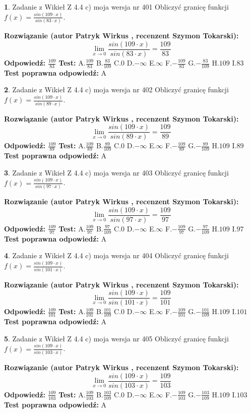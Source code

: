 \documentclass[12pt, a4paper]{article}
\theoremstyle{definition} %
\newtheorem{zad}{}
\newcommand{\zadStart}[1]{\begin{zad}#1\newline}
\newcommand{\zadStop}{\end{zad}}
\newcommand{\rozwStart}[2]{\noindent \textbf{Rozwiązanie (autor #1 , recenzent #2): }\newline}
\newcommand{\rozwStop}{\newline}
\newcommand{\odpStart}{\noindent \textbf{Odpowiedź:}\newline}
\newcommand{\odpStop}{\newline}
\newcommand{\testStart}{\noindent \textbf{Test:}\newline}
\newcommand{\testStop}{\newline}
\newcommand{\kluczStart}{\noindent \textbf{Test poprawna odpowiedź:}\newline}
\newcommand{\kluczStop}{\newline}
\begin{document}
\zadStart{Zadanie z Wikieł Z 4.4 c) moja wersja nr 401}
Obliczyć granicę funkcji $f(x)=\frac{sin(109\cdot x)}{sin(83\cdot x)}$.
\zadStop
\rozwStart{Patryk Wirkus}{Szymon Tokarski}
$$\lim\limits_{x\to 0}\frac{sin(109\cdot x)}{sin(83\cdot x)}=
\frac{109}{83}$$
\rozwStop
\odpStart
$\frac{109}{83}$
\odpStop
\testStart
A.$\frac{109}{83}$
B.$\frac{83}{109}$
C.$0$
D.$-\infty$
E.$\infty$
F.$-\frac{109}{83}$
G.$-\frac{83}{109}$
H.$109$
I.$83$
\testStop
\kluczStart
A
\kluczStop



\zadStart{Zadanie z Wikieł Z 4.4 c) moja wersja nr 402}
Obliczyć granicę funkcji $f(x)=\frac{sin(109\cdot x)}{sin(89\cdot x)}$.
\zadStop
\rozwStart{Patryk Wirkus}{Szymon Tokarski}
$$\lim\limits_{x\to 0}\frac{sin(109\cdot x)}{sin(89\cdot x)}=
\frac{109}{89}$$
\rozwStop
\odpStart
$\frac{109}{89}$
\odpStop
\testStart
A.$\frac{109}{89}$
B.$\frac{89}{109}$
C.$0$
D.$-\infty$
E.$\infty$
F.$-\frac{109}{89}$
G.$-\frac{89}{109}$
H.$109$
I.$89$
\testStop
\kluczStart
A
\kluczStop



\zadStart{Zadanie z Wikieł Z 4.4 c) moja wersja nr 403}
Obliczyć granicę funkcji $f(x)=\frac{sin(109\cdot x)}{sin(97\cdot x)}$.
\zadStop
\rozwStart{Patryk Wirkus}{Szymon Tokarski}
$$\lim\limits_{x\to 0}\frac{sin(109\cdot x)}{sin(97\cdot x)}=
\frac{109}{97}$$
\rozwStop
\odpStart
$\frac{109}{97}$
\odpStop
\testStart
A.$\frac{109}{97}$
B.$\frac{97}{109}$
C.$0$
D.$-\infty$
E.$\infty$
F.$-\frac{109}{97}$
G.$-\frac{97}{109}$
H.$109$
I.$97$
\testStop
\kluczStart
A
\kluczStop



\zadStart{Zadanie z Wikieł Z 4.4 c) moja wersja nr 404}
Obliczyć granicę funkcji $f(x)=\frac{sin(109\cdot x)}{sin(101\cdot x)}$.
\zadStop
\rozwStart{Patryk Wirkus}{Szymon Tokarski}
$$\lim\limits_{x\to 0}\frac{sin(109\cdot x)}{sin(101\cdot x)}=
\frac{109}{101}$$
\rozwStop
\odpStart
$\frac{109}{101}$
\odpStop
\testStart
A.$\frac{109}{101}$
B.$\frac{101}{109}$
C.$0$
D.$-\infty$
E.$\infty$
F.$-\frac{109}{101}$
G.$-\frac{101}{109}$
H.$109$
I.$101$
\testStop
\kluczStart
A
\kluczStop



\zadStart{Zadanie z Wikieł Z 4.4 c) moja wersja nr 405}
Obliczyć granicę funkcji $f(x)=\frac{sin(109\cdot x)}{sin(103\cdot x)}$.
\zadStop
\rozwStart{Patryk Wirkus}{Szymon Tokarski}
$$\lim\limits_{x\to 0}\frac{sin(109\cdot x)}{sin(103\cdot x)}=
\frac{109}{103}$$
\rozwStop
\odpStart
$\frac{109}{103}$
\odpStop
\testStart
A.$\frac{109}{103}$
B.$\frac{103}{109}$
C.$0$
D.$-\infty$
E.$\infty$
F.$-\frac{109}{103}$
G.$-\frac{103}{109}$
H.$109$
I.$103$
\testStop
\kluczStart
A
\kluczStop
\end{document}
